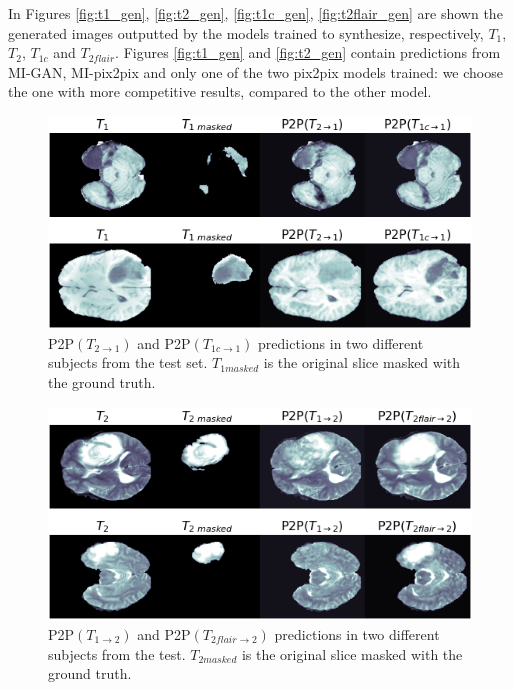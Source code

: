 In Figures \ref{fig:t1_gen}, \ref{fig:t2_gen}, \ref{fig:t1c_gen}, \ref{fig:t2flair_gen} are shown the generated images outputted by the models trained to synthesize, respectively, $T_{1}$, $T_{2}$, $T_{1c}$ and $T_{2flair}$. 
Figures \ref{fig:t1_gen} and \ref{fig:t2_gen} contain predictions from MI-GAN, MI-pix2pix and only one of the two pix2pix models trained: we choose the one with more competitive results, compared to the other model.

\begin{figure}[H]
\centering
\includegraphics[width=0.49\textheight]{images/pix2pix.t1.pdf}
\caption[P2P$(T_{2 \rightarrow 1})$ and P2P$(T_{1c \rightarrow 1})$ predictions]{P2P$(T_{2 \rightarrow 1})$ and P2P$(T_{1c \rightarrow 1})$ predictions in two different subjects from the test set. $T_{1masked}$ is the original slice masked with the ground truth.}
\label{fig:pix2pix_t1}
\end{figure}

\begin{figure}[H]
\centering
\includegraphics[width=0.49\textheight]{images/pix2pix.t2.pdf}
\caption[P2P$(T_{1 \rightarrow 2})$ and P2P$(T_{2flair \rightarrow 2})$ predictions]{P2P$(T_{1 \rightarrow 2})$ and P2P$(T_{2flair \rightarrow 2})$ predictions in two different subjects from the test. $T_{2masked}$ is the original slice masked with the ground truth.}
\label{fig:pix2pix_t2}
\end{figure}

